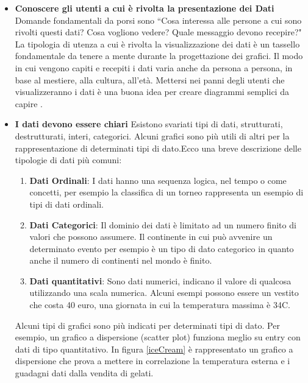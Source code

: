 \begin{itemize}
    \item \textbf{Conoscere gli utenti a cui è rivolta la presentazione dei Dati}
    Domande fondamentali da porsi sono ``Cosa interessa alle persone a cui sono rivolti questi dati? Cosa vogliono vedere? Quale messaggio devono recepire?"\newline
    La tipologia di utenza a cui è rivolta la visualizzazione dei dati è un tassello fondamentale da tenere a mente durante la progettazione dei grafici.\newline
    Il modo in cui vengono capiti e recepiti i dati varia anche da persona a persona, in base al mestiere, alla cultura, all'età.\newline
    Mettersi nei panni degli utenti che visualizzeranno i dati è una buona idea per creare diagrammi semplici da capire \cite{oracle}.
    \item \textbf{I dati devono essere chiari}\newline
Esistono svariati tipi di dati, strutturati, destrutturati, interi, categorici.
Alcuni grafici sono più utili di altri per la rappresentazione di determinati tipi di dato.\newline Ecco una breve descrizione delle tipologie di dati più comuni:
\begin{enumerate}
    \item \textbf{Dati Ordinali}: I dati hanno una sequenza logica, nel tempo o come concetti, per esempio la classifica di un torneo rappresenta un esempio di tipi di dati ordinali.
    \item \textbf{Dati Categorici}: Il dominio dei dati è limitato ad un numero finito di valori che possono assumere. Il continente in cui può avvenire un determinato evento per esempio è un tipo di dato categorico in quanto anche il numero di continenti nel mondo è finito.
    \item \textbf{Dati quantitativi}: Sono dati numerici, indicano il valore di qualcosa utilizzando una scala numerica. Alcuni esempi possono essere un vestito che costa 40 euro, una giornata in cui la temperatura massima è 34C\degree.
\end{enumerate}
Alcuni tipi di grafici sono più indicati per determinati tipi di dato. Per esempio, un grafico a dispersione (scatter plot) funziona meglio su entry con dati di tipo quantitativo.
In figura \ref{iceCream} è rappresentato un grafico a dispersione che prova a mettere in correlazione la temperatura esterna e i guadagni dati dalla vendita di gelati.
\begin{figure}[H]

\end{figure}
\end{itemize}
